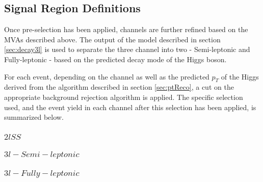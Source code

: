 
\subsection{Signal Region Definitions}
\label{subsec:sigRegions}

Once pre-selection has been applied, channels are further refined based on the MVAs described above. The output of the model described in section \ref{sec:decay3l} is used to separate the three channel into two - Semi-leptonic and Fully-leptonic - based on the predicted decay mode of the Higgs boson. 

For each event, depending on the channel as well as the predicted $p_T$ of the Higgs derived from the algorithm described in section \ref{sec:ptReco}, a cut on the appropriate background rejection algorithm is applied. The specific selection used, and the event yield in each channel after this selection has been applied, is summarized below.

\subsubsection{$2lSS$}

\subsubsection{$3l - Semi-leptonic$}

\subsubsection{$3l - Fully-leptonic$}
